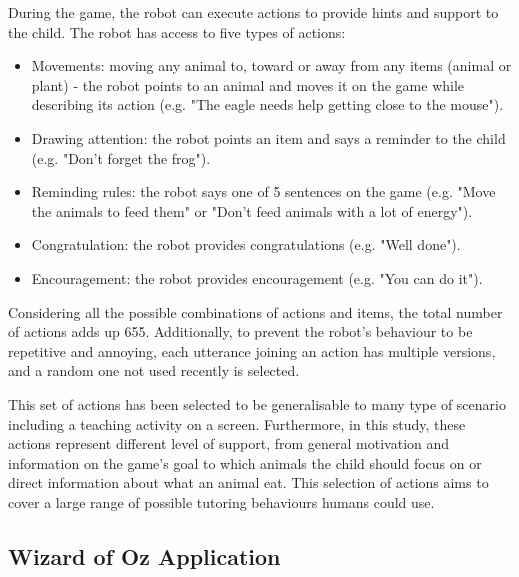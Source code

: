 During the game, the robot can execute actions to provide hints and support to the child. The robot has access to five types of actions:
\begin{itemize}
	\item Movements: moving any animal to, toward or away from any items (animal or plant) - the robot points to an animal and moves it on the game while describing its action (e.g. "The eagle needs help getting close to the mouse").
	\item Drawing attention: the robot points an item and says a reminder to the child (e.g. "Don't forget the frog").
	\item Reminding rules: the robot says one of 5 sentences on the game (e.g. "Move the animals to feed them" or "Don't feed animals with a lot of energy").
	\item Congratulation: the robot provides congratulations (e.g. "Well done").
	\item Encouragement: the robot provides encouragement (e.g. "You can do it").
\end{itemize}
Considering all the possible combinations of actions and items, the total number of actions adds up 655. Additionally, to prevent the robot's behaviour to be repetitive and annoying, each utterance joining an action has multiple versions, and a random one not used recently is selected. 

This set of actions has been selected to be generalisable to many type of scenario including a teaching activity on a screen. Furthermore, in this study, these actions represent different level of support, from general motivation and information on the game's goal to which animals the child should focus on or direct information about what an animal eat. This selection of actions aims to cover a large range of possible tutoring behaviours humans could use. 

\subsection{Wizard of Oz Application}

